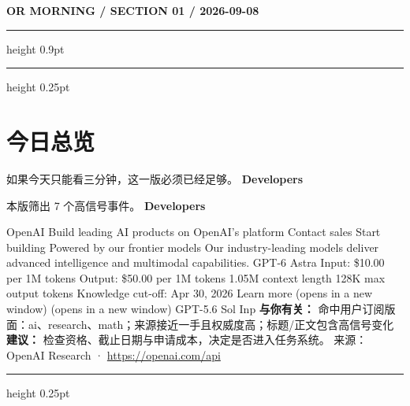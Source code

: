\documentclass[10.5pt]{ctexart}
\begin{document}
{\small\bfseries OR MORNING / SECTION 01 / 2026-09-08}
\vspace{2mm}
\hrule height 0.9pt
\vspace{1.5mm}
\hrule height 0.25pt
\vspace{4mm}
\section*{今日总览}
{\color{ormuted} 如果今天只能看三分钟，这一版必须已经足够。}
\vspace{2mm}
{\fontsize{25}{29}\selectfont\bfseries Developers}\par
\vspace{2mm}
{\large 本版筛出 7 个高信号事件。}
\vspace{3mm}
{\Large\bfseries Developers}\par
OpenAI Build leading AI products on OpenAI’s platform Contact sales Start building Powered by our frontier models Our industry-leading models deliver advanced intelligence and multimodal capabilities. GPT-6 Astra Input: \$10.00 per 1M tokens Output: \$50.00 per 1M tokens 1.05M context length 128K max output tokens Knowledge cut-off: Apr 30, 2026 Learn more (opens in a new window) (opens in a new window) GPT-5.6 Sol Inp
\textbf{与你有关：} 命中用户订阅版面：ai、research、math；来源接近一手且权威度高；标题/正文包含高信号变化
\textbf{建议：} 检查资格、截止日期与申请成本，决定是否进入任务系统。
{\footnotesize\color{ormuted} 来源：OpenAI Research · \url{https://openai.com/api}}
\vspace{3mm}
\hrule height 0.25pt
\vspace{3mm}
\end{document}

